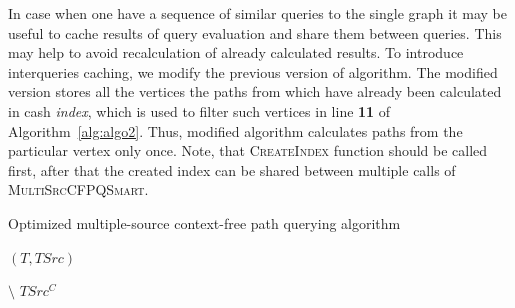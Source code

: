 In case when one have a sequence of similar queries to the single graph it may be useful to cache results of query evaluation and share them between queries. 
This may help to avoid recalculation of already calculated results. 
To introduce interqueries caching, we modify the previous version of algorithm.
The modified version stores all the vertices the paths from which have already been calculated in cash \textit{index}, which is used to filter such vertices in line \textbf{11} of Algorithm~\ref{alg:algo2}. Thus, modified algorithm calculates paths from the particular vertex only once.
Note, that \textsc{CreateIndex} function should be called first, after that the created index can be shared between multiple calls of \textsc{MultiSrcCFPQSmart}.

\begin{algorithm}
\begin{algorithmic}[1]
\caption{Optimized multiple-source context-free path querying algorithm}
\label{alg:algo2}
    
    
     
        \EndFor
    \EndFor
    
    \State \Return $(T, TSrc)$
\EndFunction
\State
{}
    

    \EndFor


             $\setminus$ $TSrc^C$
        \EndFor
    \EndWhile
\EndFunction


\end{algorithmic}
\end{algorithm}


